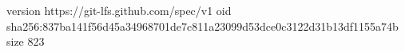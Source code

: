 version https://git-lfs.github.com/spec/v1
oid sha256:837ba141f56d45a34968701de7c811a23099d53dce0c3122d31b13df1155a74b
size 823

